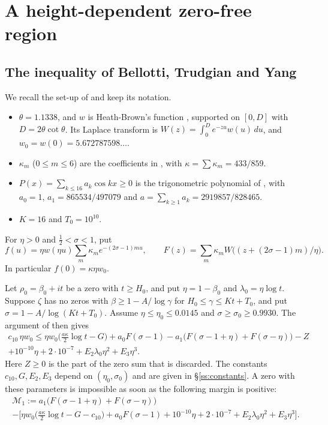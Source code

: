 \documentclass[11pt]{amsart}
\numberwithin{equation}{section}
\theoremstyle{definition}
\theoremstyle{remark}
\begin{document}
\section{A height-dependent zero-free region}\label{sec:zfr}

\subsection{The inequality of Bellotti, Trudgian and Yang}
We recall the set-up of \cite{BTY} and keep its notation.
\begin{itemize}
\item $\theta = 1.1338$, and $w$ is Heath-Brown's function \cite[Def.~1]{BTY}, supported on $[0,D]$ with $D = 2\theta\cot\theta$.
  Its Laplace transform is $W(z) = \int_0^D e^{-zu}w(u)\,du$, and $w_0 = w(0) = 5.672787598\ldots$.
\item $\kappa_m$ ($0 \le m \le 6$) are the coefficients in \cite[(18)]{BTY}, with $\kappa = \sum\kappa_m = 433/859$.
\item $P(x) = \sum_{k\le 16}a_k\cos kx \ge 0$ is the trigonometric polynomial of \cite[\S4]{BTY}, with $a_0 = 1$, $a_1 = 865534/497079$ and $a = \sum_{k\ge1}a_k = 2919857/828465$.
\item $K = 16$ and $T_0 = 10^{10}$.
\end{itemize}
For $\eta > 0$ and $\frac12 < \sigma < 1$, put
\[
f(u) = \eta w(\eta u)\sum_{m}\kappa_m e^{-(2\sigma-1)mu}, \qquad F(z) = \sum_m \kappa_m W\big((z + (2\sigma-1)m)/\eta\big).
\]
In particular $f(0) = \kappa\eta w_0$.

Let $\rho_0 = \beta_0 + it$ be a zero with $t \ge H_0$, and put $\eta = 1-\beta_0$ and $\lambda_0 = \eta\log t$.
Suppose $\zeta$ has no zeros with $\beta \ge 1 - A/\log\gamma$ for $H_0 \le \gamma \le Kt + T_0$, and put $\sigma = 1 - A/\log(Kt+T_0)$.
Assume $\eta \le \eta_0 \le 0.0145$ and $\sigma \ge \sigma_0 \ge 0.9930$.
The argument of \cite[Lemma~15]{BTY} then gives
\begin{multline}\label{eq:bty}
c_{10}\,\eta w_0 \le \eta w_0\Big(\frac{a\kappa}2\log t - G\Big) + a_0F(\sigma-1) - a_1\big(F(\sigma-1+\eta) + F(\sigma-\eta)\big) - Z\\ + 10^{-10}\eta + 2\cdot10^{-7} + E_2\lambda_0\eta^2 + E_3\eta^3 .
\end{multline}
Here $Z \ge 0$ is the part of the zero sum that is discarded.
The constants $c_{10}, G, E_2, E_3$ depend on $(\eta_0,\sigma_0)$ and are given in \S\ref{ss:constants}.
A zero with these parameters is impossible as soon as the following margin is positive:
\begin{multline}\label{eq:margin1}
\mathcal M_1 := a_1\big(F(\sigma-1+\eta)+F(\sigma-\eta)\big)\\ - \Big[\eta w_0\big(\tfrac{a\kappa}2\log t - G - c_{10}\big) + a_0F(\sigma-1) + 10^{-10}\eta + 2\cdot 10^{-7} + E_2\lambda_0\eta^2 + E_3\eta^3\Big] .
\end{multline}
\end{document}
